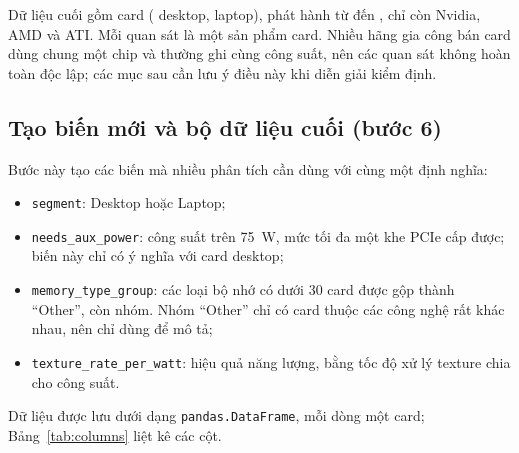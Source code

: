 Dữ liệu cuối gồm \PreRowsFinal{} card (\PreDesktop{} desktop, \PreLaptop{} laptop), phát
hành từ \PreReleaseYearMin{} đến \PreReleaseYearMax, chỉ còn Nvidia, AMD và ATI. Mỗi quan
sát là một sản phẩm card. Nhiều hãng gia công bán card dùng chung một chip và thường ghi cùng
công suất, nên các quan sát không hoàn toàn độc lập; các mục sau cần lưu ý điều này khi diễn
giải kiểm định.

\subsection{Tạo biến mới và bộ dữ liệu cuối (bước 6)}

Bước này tạo các biến mà nhiều phân tích cần dùng với cùng một định nghĩa:
\begin{itemize}
  \item \texttt{segment}: Desktop hoặc Laptop;
  \item \texttt{needs\_aux\_power}: công suất trên 75~W, mức tối đa một khe PCIe cấp được;
    biến này chỉ có ý nghĩa với card desktop;
  \item \texttt{memory\_type\_group}: các loại bộ nhớ có dưới 30 card được gộp thành
    ``Other'', còn \PreMemoryTypeGroups{} nhóm. Nhóm ``Other'' chỉ có
    \PreMemoryTypeOtherSize{} card thuộc các công nghệ rất khác nhau, nên chỉ dùng để mô tả;
  \item \texttt{texture\_rate\_per\_watt}: hiệu quả năng lượng, bằng tốc độ xử lý texture
    chia cho công suất.
\end{itemize}
Dữ liệu được lưu dưới dạng \texttt{pandas.DataFrame}, mỗi dòng một card;
Bảng~\ref{tab:columns} liệt kê các cột.

